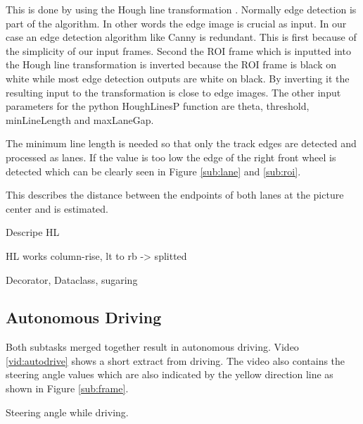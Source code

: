 \documentclass[conference]{IEEEtran}
\begin{document}
This is done by using the Hough line transformation \cite{Hough1962}.
Normally edge detection is part of the algorithm.
In other words the edge image is crucial as input.
In our case an edge detection algorithm like Canny is redundant.
This is first because of the simplicity of our input frames.
Second the ROI frame which is inputted into the Hough line transformation is inverted because the ROI frame is black on white while most edge detection outputs are white on black.
By inverting it the resulting input to the transformation is close to edge images.
The other input parameters for the python HoughLinesP function are theta, threshold, minLineLength and maxLaneGap.
\begin{description}
	\setlength\itemsep{.25em}
	\item[minLineLength] The minimum line length is needed so that only the track edges are detected and processed as lanes. If the value is too low the edge of the right front wheel is detected which can be clearly seen in Figure \ref{sub:lane} and \ref{sub:roi}. 
	\item[maxLineGap] This describes the distance between the endpoints of both lanes at the picture center and is estimated.
\end{description}

Descripe HL

HL works column-rise, lt to rb -> splitted

Decorator, Dataclass, sugaring

\subsection{Autonomous Driving}

Both subtasks merged together result in autonomous driving.
Video \ref{vid:autodrive} shows a short extract from driving.
The video also contains the steering angle values which are also indicated by the yellow direction line as shown in Figure \ref{sub:frame}.

\begin{video}[t]
	\caption{Steering angle while driving.}
	\label{vid:autodrive}
\end{video}
\end{document}
